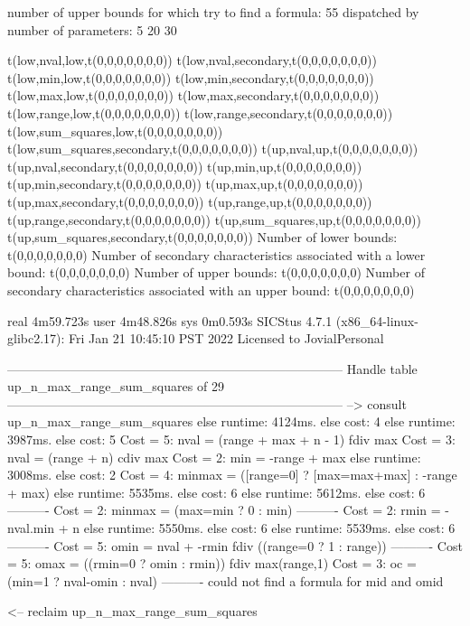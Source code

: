 number of upper bounds for which try to find a formula: 55
dispatched by number of parameters: 5  20  30

t(low,nval,low,t(0,0,0,0,0,0,0))
t(low,nval,secondary,t(0,0,0,0,0,0,0))
t(low,min,low,t(0,0,0,0,0,0,0))
t(low,min,secondary,t(0,0,0,0,0,0,0))
t(low,max,low,t(0,0,0,0,0,0,0))
t(low,max,secondary,t(0,0,0,0,0,0,0))
t(low,range,low,t(0,0,0,0,0,0,0))
t(low,range,secondary,t(0,0,0,0,0,0,0))
t(low,sum_squares,low,t(0,0,0,0,0,0,0))
t(low,sum_squares,secondary,t(0,0,0,0,0,0,0))
t(up,nval,up,t(0,0,0,0,0,0,0))
t(up,nval,secondary,t(0,0,0,0,0,0,0))
t(up,min,up,t(0,0,0,0,0,0,0))
t(up,min,secondary,t(0,0,0,0,0,0,0))
t(up,max,up,t(0,0,0,0,0,0,0))
t(up,max,secondary,t(0,0,0,0,0,0,0))
t(up,range,up,t(0,0,0,0,0,0,0))
t(up,range,secondary,t(0,0,0,0,0,0,0))
t(up,sum_squares,up,t(0,0,0,0,0,0,0))
t(up,sum_squares,secondary,t(0,0,0,0,0,0,0))
Number of lower bounds:                                             t(0,0,0,0,0,0,0)
Number of secondary characteristics associated with a lower bound:  t(0,0,0,0,0,0,0)
Number of upper bounds:                                             t(0,0,0,0,0,0,0)
Number of secondary characteristics associated with an upper bound: t(0,0,0,0,0,0,0)

real	4m59.723s
user	4m48.826s
sys	0m0.593s
SICStus 4.7.1 (x86_64-linux-glibc2.17): Fri Jan 21 10:45:10 PST 2022
Licensed to JovialPersonal


--------------------------------------------------------------------------------
Handle table up_n_max_range_sum_squares of 29
--------------------------------------------------------------------------------
--> consult up_n_max_range_sum_squares
else runtime: 4124ms. else cost: 4
else runtime: 3987ms. else cost: 5
Cost =  5:  nval   = (range + max + n - 1) fdiv max
Cost =  3:  nval   = (range + n) cdiv max
Cost =  2:  min    = -range + max
else runtime: 3008ms. else cost: 2
Cost =  4:  minmax = ([range=0] ? [max=max+max] : -range + max) %
else runtime: 5535ms. else cost: 6
else runtime: 5612ms. else cost: 6
----------
Cost =  2:  minmax = (max=min ? 0 : min)
----------
Cost =  2:  rmin   = -nval.min + n
else runtime: 5550ms. else cost: 6
else runtime: 5539ms. else cost: 6
----------
Cost =  5:  omin   = nval + -rmin fdiv ((range=0 ? 1 : range)) %
----------
Cost =  5:  omax   = ((rmin=0 ? omin : rmin)) fdiv max(range,1) %
Cost =  3:  oc     = (min=1 ? nval-omin : nval)
----------
could not find a formula for mid and omid

<-- reclaim up_n_max_range_sum_squares

